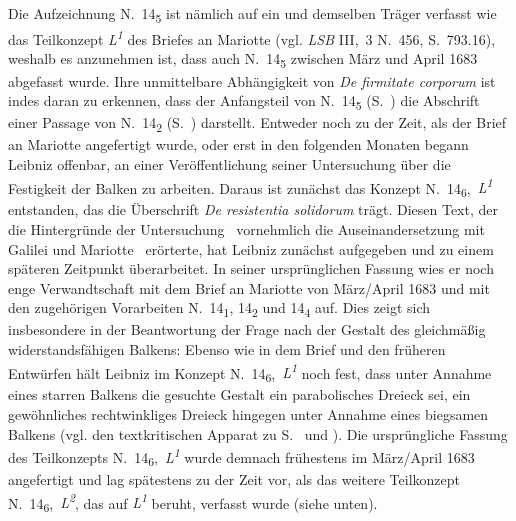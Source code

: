 Die Aufzeichnung N.~14\textsubscript{5} ist nämlich auf ein und demselben Träger verfasst wie das Teilkonzept \textit{L\textsuperscript{1}} des Briefes an Mariotte (vgl. \textit{LSB} III,~3 N.~456, S.~793.16),
weshalb es anzunehmen ist, dass auch N.~14\textsubscript{5} zwischen März und April 1683 abgefasst wurde.
Ihre unmittelbare Abhängigkeit von \textit{De firmitate corporum} ist indes daran zu erkennen, dass der Anfangsteil von N.~14\textsubscript{5} (S.~) die Abschrift einer Passage von N.~14\textsubscript{2} (S.~) darstellt.%
\pend%
\pstart%
Entweder noch zu der Zeit, als der Brief an Mariotte angefertigt wurde, oder erst in den folgenden Monaten begann Leibniz offenbar, an einer Veröffentlichung seiner Untersuchung über die Festigkeit der Balken zu arbeiten.
Daraus ist zunächst das Konzept N.~14\textsubscript{6},~\textit{L\textsuperscript{1}} entstanden, das die Überschrift \textit{De resistentia solidorum} trägt.
Diesen Text, der die Hintergründe der Untersuchung \textendash\ vornehmlich die Auseinandersetzung mit Galilei und Mariotte %
\textendash\ erörterte, hat Leibniz zunächst aufgegeben und zu einem späteren Zeitpunkt überarbeitet.
In seiner ursprünglichen Fassung wies er noch enge Verwandtschaft mit dem Brief an Mariotte von März/April 1683 und mit den zugehörigen Vorarbeiten N.~14\textsubscript{1}, 14\textsubscript{2} und 14\textsubscript{4} auf.
Dies zeigt sich insbesondere in der Beantwortung der Frage nach der Gestalt des gleichmäßig widerstandsfähigen Balkens:
Ebenso wie in dem Brief und den früheren Entwürfen hält Leibniz im Konzept N.~14\textsubscript{6},~\textit{L\textsuperscript{1}} noch fest, dass unter Annahme eines starren Balkens die gesuchte Gestalt ein parabolisches Dreieck sei, ein gewöhnliches rechtwinkliges Dreieck hingegen unter Annahme eines biegsamen Balkens (vgl. den textkritischen Apparat zu S.~ und ).
Die ursprüngliche Fassung des Teilkonzepts N.~14\textsubscript{6},~\textit{L\textsuperscript{1}} wurde demnach frühestens im März/April 1683 angefertigt und lag spätestens zu der Zeit vor, als das weitere Teilkonzept N.~14\textsubscript{6},~\textit{L\textsuperscript{2}}, das auf \textit{L\textsuperscript{1}} beruht, verfasst wurde (siehe unten).
